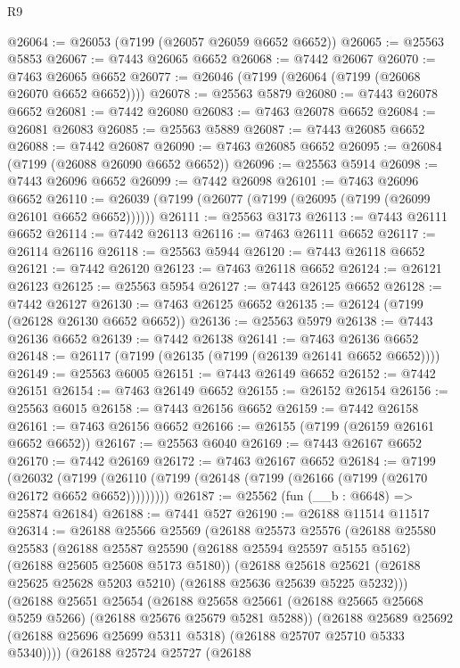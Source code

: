 \begin{lexlean}{R9}
\begin{coremodule}
@26064 := @26053 (@7199 (@26057 @26059 @6652 @6652))
@26065 := @25563 @5853
@26067 := @7443 @26065 @6652
@26068 := @7442 @26067
@26070 := @7463 @26065 @6652
@26077 := @26046 (@7199 (@26064 (@7199 (@26068 @26070 @6652 @6652))))
@26078 := @25563 @5879
@26080 := @7443 @26078 @6652
@26081 := @7442 @26080
@26083 := @7463 @26078 @6652
@26084 := @26081 @26083
@26085 := @25563 @5889
@26087 := @7443 @26085 @6652
@26088 := @7442 @26087
@26090 := @7463 @26085 @6652
@26095 := @26084 (@7199 (@26088 @26090 @6652 @6652))
@26096 := @25563 @5914
@26098 := @7443 @26096 @6652
@26099 := @7442 @26098
@26101 := @7463 @26096 @6652
@26110 := @26039 (@7199 (@26077 (@7199 (@26095 (@7199 (@26099 @26101 @6652 @6652))))))
@26111 := @25563 @3173
@26113 := @7443 @26111 @6652
@26114 := @7442 @26113
@26116 := @7463 @26111 @6652
@26117 := @26114 @26116
@26118 := @25563 @5944
@26120 := @7443 @26118 @6652
@26121 := @7442 @26120
@26123 := @7463 @26118 @6652
@26124 := @26121 @26123
@26125 := @25563 @5954
@26127 := @7443 @26125 @6652
@26128 := @7442 @26127
@26130 := @7463 @26125 @6652
@26135 := @26124 (@7199 (@26128 @26130 @6652 @6652))
@26136 := @25563 @5979
@26138 := @7443 @26136 @6652
@26139 := @7442 @26138
@26141 := @7463 @26136 @6652
@26148 := @26117 (@7199 (@26135 (@7199 (@26139 @26141 @6652 @6652))))
@26149 := @25563 @6005
@26151 := @7443 @26149 @6652
@26152 := @7442 @26151
@26154 := @7463 @26149 @6652
@26155 := @26152 @26154
@26156 := @25563 @6015
@26158 := @7443 @26156 @6652
@26159 := @7442 @26158
@26161 := @7463 @26156 @6652
@26166 := @26155 (@7199 (@26159 @26161 @6652 @6652))
@26167 := @25563 @6040
@26169 := @7443 @26167 @6652
@26170 := @7442 @26169
@26172 := @7463 @26167 @6652
@26184 := @7199
    (@26032 (@7199 (@26110 (@7199 (@26148 (@7199 (@26166 (@7199 (@26170 @26172 @6652 @6652)))))))))
@26187 := @25562 (fun (__b : @6648) => @25874 @26184)
@26188 := @7441 @527
@26190 := @26188 @11514 @11517
@26314 := @26188
    @25566
    @25569
    (@26188
      @25573
      @25576
      (@26188
        @25580
        @25583
        (@26188 @25587 @25590 (@26188 @25594 @25597 @5155 @5162) (@26188 @25605 @25608 @5173 @5180))
        (@26188
          @25618
          @25621
          (@26188 @25625 @25628 @5203 @5210)
          (@26188 @25636 @25639 @5225 @5232)))
      (@26188
        @25651
        @25654
        (@26188 @25658 @25661 (@26188 @25665 @25668 @5259 @5266) (@26188 @25676 @25679 @5281 @5288))
        (@26188
          @25689
          @25692
          (@26188 @25696 @25699 @5311 @5318)
          (@26188 @25707 @25710 @5333 @5340))))
    (@26188
      @25724
      @25727
      (@26188

\end{coremodule}
\end{lexlean}
